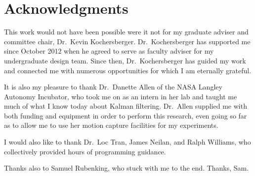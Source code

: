 \chapter*{Acknowledgments}

This work would not have been possible were it not for my graduate adviser and committee chair, Dr.~Kevin Kochersberger. Dr.~Kochersberger has supported me since October 2012 when he agreed to serve as faculty adviser for my undergraduate design team. Since then, Dr.~Kochersberger has guided my work and connected me with numerous opportunities for which I am eternally grateful.

It is also my pleasure to thank Dr.~Danette Allen of the NASA Langley Autonomy Incubator, who took me on as an intern in her lab and taught me much of what I know today about Kalman filtering. Dr.~Allen supplied me with both funding and equipment in order to perform this research, even going so far as to allow me to use her motion capture facilities for my experiments.

I would also like to thank Dr.~Loc Tran, James Neilan, and Ralph Williams, who collectively provided hours of programming guidance. 

Thanks also to Samuel Rubenking, who stuck with me to the end. Thanks, Sam.